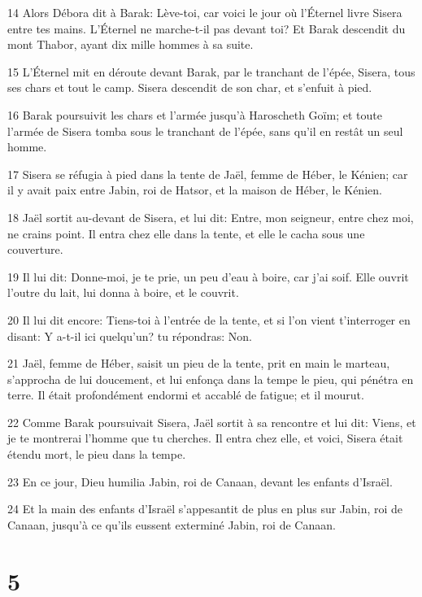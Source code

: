 \par 14 Alors Débora dit à Barak: Lève-toi, car voici le jour où l'Éternel livre Sisera entre tes mains. L'Éternel ne marche-t-il pas devant toi? Et Barak descendit du mont Thabor, ayant dix mille hommes à sa suite.
\par 15 L'Éternel mit en déroute devant Barak, par le tranchant de l'épée, Sisera, tous ses chars et tout le camp. Sisera descendit de son char, et s'enfuit à pied.
\par 16 Barak poursuivit les chars et l'armée jusqu'à Haroscheth Goïm; et toute l'armée de Sisera tomba sous le tranchant de l'épée, sans qu'il en restât un seul homme.
\par 17 Sisera se réfugia à pied dans la tente de Jaël, femme de Héber, le Kénien; car il y avait paix entre Jabin, roi de Hatsor, et la maison de Héber, le Kénien.
\par 18 Jaël sortit au-devant de Sisera, et lui dit: Entre, mon seigneur, entre chez moi, ne crains point. Il entra chez elle dans la tente, et elle le cacha sous une couverture.
\par 19 Il lui dit: Donne-moi, je te prie, un peu d'eau à boire, car j'ai soif. Elle ouvrit l'outre du lait, lui donna à boire, et le couvrit.
\par 20 Il lui dit encore: Tiens-toi à l'entrée de la tente, et si l'on vient t'interroger en disant: Y a-t-il ici quelqu'un? tu répondras: Non.
\par 21 Jaël, femme de Héber, saisit un pieu de la tente, prit en main le marteau, s'approcha de lui doucement, et lui enfonça dans la tempe le pieu, qui pénétra en terre. Il était profondément endormi et accablé de fatigue; et il mourut.
\par 22 Comme Barak poursuivait Sisera, Jaël sortit à sa rencontre et lui dit: Viens, et je te montrerai l'homme que tu cherches. Il entra chez elle, et voici, Sisera était étendu mort, le pieu dans la tempe.
\par 23 En ce jour, Dieu humilia Jabin, roi de Canaan, devant les enfants d'Israël.
\par 24 Et la main des enfants d'Israël s'appesantit de plus en plus sur Jabin, roi de Canaan, jusqu'à ce qu'ils eussent exterminé Jabin, roi de Canaan.

\chapter{5}

